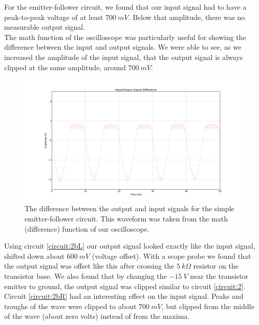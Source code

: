 \documentclass[11pt]{article}
\begin{document}
For the emitter-follower circuit, we found that our input signal had to have a peak-to-peak voltage of at least $700\ mV$. Below that amplitude, there was no measurable output signal.\\

The math function of the oscilloscope was particularly useful for showing the difference between the input and output signals. We were able to see, as we increased the amplitude of the input signal, that the output signal is always clipped at the same amplitude, around $700\ mV$.\\

\begin{figure}[H]
    \centering
    \includegraphics[scale=0.4]{Plots/fig2a.png}
    \caption{The difference between the output and input signals for the simple emitter-follower circuit. This waveform was taken from the math (difference) function of our oscilloscope.}
    \label{fig:2a}
\end{figure}

Using circuit \ref{circuit:2bL} our output signal looked exactly like the input signal, shifted down about $600\ mV$ (voltage offset). With a scope probe we found that the output signal was offset like this after crossing the $5\ k \Omega$ resistor on the transistor base. We also found that by changing the $-15\ V$ near the transistor emitter to ground, the output signal was clipped similar to circuit \ref{circuit:2}.\\

Circuit \ref{circuit:2bR} had an interesting effect on the input signal. Peaks and troughs of the wave were clipped to about $700\ mV$, but clipped from the middle of the wave (about zero volts) instead of from the maxima.\\
\end{document}
